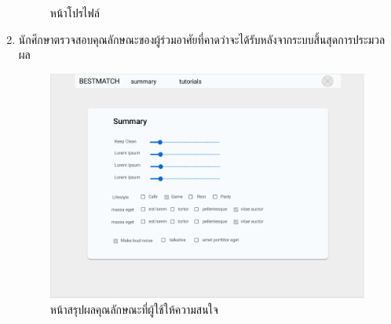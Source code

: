 \begin{enumerate}
\begin{figure}[h]
\begin{center}
          \end{center}
          \caption{หน้าโปรไฟล์}
          \label{fig:profile}
        \end{figure}
        \clearpage
  \item นักศึกษาตรวจสอบคุณลักษณะของผู้ร่วมอาศัยที่คาดว่าจะได้รับหลังจากระบบสิ้นสุดการประมวลผล
        \begin{figure}[h]
          \begin{center}
            \includegraphics[width=\linewidth]{photo/student/summary.png}
          \end{center}
          \caption{หน้าสรุปผลคุณลักษณะที่ผู้ใช้ให้ความสนใจ}
          \label{fig:summary}
        \end{figure}
\end{enumerate}


